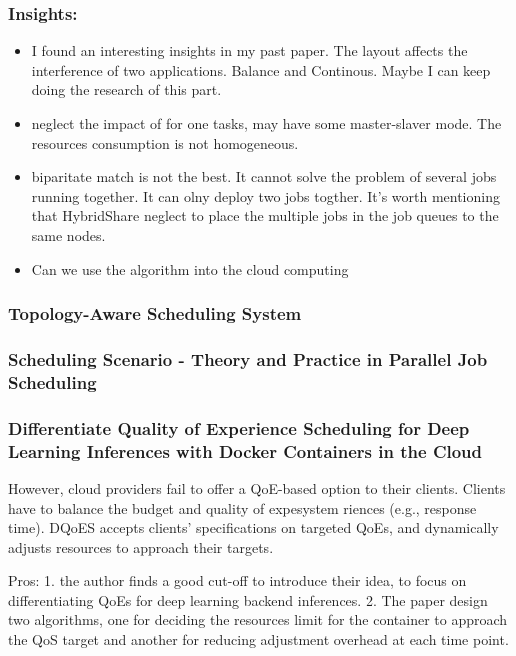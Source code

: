 \documentclass[UTF8]{article}
\begin{document}
    \subsubsection{Insights:}
    \begin{itemize}
        \item I found an interesting insights in my past paper. The layout affects the interference of two applications. Balance and Continous. Maybe I can keep doing the research of this part.
        \item neglect the impact of for one tasks, may have some master-slaver mode. The resources consumption is not homogeneous.
        \item biparitate match is not the best. It cannot solve the problem of several jobs running together. It can olny deploy two jobs togther. It's worth mentioning that HybridShare neglect to place the multiple jobs in the job queues to the same nodes.
        \item Can we use the algorithm into the cloud computing
    \end{itemize}
    \subsubsection{Topology-Aware Scheduling System}
    \subsubsection{Scheduling Scenario - Theory and Practice in Parallel Job Scheduling}
    \subsubsection{Differentiate Quality of Experience Scheduling for Deep Learning Inferences with Docker Containers in the Cloud}
    However, cloud providers fail to offer a QoE-based option to their clients. Clients have to balance the budget and quality of expesystem
    riences (e.g., response time). DQoES accepts clients’ specifications on targeted QoEs, and dynamically adjusts resources to approach their targets. 
    
    Pros: 1. the author finds a good cut-off to introduce their idea, to focus on differentiating QoEs for deep learning backend inferences. 2. The paper design two algorithms, one for deciding the resources limit for the container to approach the QoS target and another for reducing adjustment overhead at each time point.
    
\end{document}
